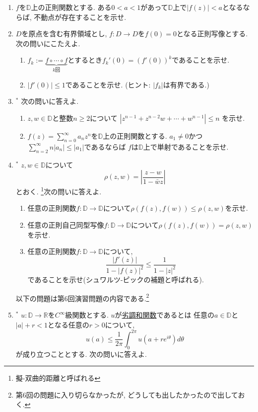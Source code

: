 \documentclass[dvipdfmx,a4paper,11pt]{article}
\newcommand{\R}{\mathbb{R}}
\newcommand{\D}{\mathbb{D}}
\theoremstyle{definition}
\begin{document}
\begin{enumerate}[label=\textbf{問}7.\arabic*]
      \item $f$を$\D$上の正則関数とする. ある$0 < a<1$があって$\D$上で$|f(z)| <a$となるならば, 不動点が存在することを示せ.

\newpage

  
\item $D$を原点を含む有界領域とし, $f : D \rightarrow D$を$f(0)=0$となる正則写像とする.次の問いにこたえよ.
     \begin{enumerate}
\setlength{\parskip}{0cm} 
  \setlength{\itemsep}{0cm} 
  \item $f_k:=\underbrace{f \circ \cdots \circ f}_{\text{$k$回}}$とするとき$f_{k}' (0) = (f'(0))^k$であることを示せ. 
  \item $|f'(0)| \le 1$であることを示せ.  (ヒント: $|f_k|$は有界である.)
    \end{enumerate} 
  \item $^{*}$ 次の問いに答えよ.
   \begin{enumerate}
\setlength{\parskip}{0cm} 
  \setlength{\itemsep}{0cm} 
  \item $z,w \in \D $と整数$ n \ge 2$について
  $
  |z^{n-1}+ z^{n-2}w + \cdots +w^{n-1}| \le n
  $
を示せ.
  \item $f(z) = \sum_{n=0}^{\infty}a_n z^n$を$\D$上の正則関数とする. 
  $a_1 \neq 0$かつ$\sum_{n=2}^{\infty}n|a_n| \le |a_1|$であるならば
  $f $は$\D$上で単射であることを示せ.
    \end{enumerate} 
  


   \item $^{*}$ $z, w \in \D$について
   $$
   \rho (z,w)= \left|\frac{z-w}{1 - \bar{w}z}\right|
   $$
   とおく. \footnote{擬-双曲的距離と呼ばれる}次の問いに答えよ. 
   \begin{enumerate}
\setlength{\parskip}{0cm} 
  \setlength{\itemsep}{0cm} 
  \item 任意の正則関数$f : \D \to \D$について$\rho(f(z), f(w)) \le \rho(z, w)$を示せ.
  \item 任意の正則自己同型写像$f : \D \to \D$について$\rho(f(z), f(w)) = \rho(z, w)$を示せ. 
   \item 任意の正則関数$f : \D \to \D$について,
   $$
   \frac{|f'(z)|}{1 - |f(z)|^2} \le    \frac{1}{1 - |z|^2} 
   $$
   であることを示せ(シュワルツ-ピックの補題と呼ばれる).
           \end{enumerate} 

\hspace{-12pt}
以下の問題は第6回演習問題の内容である.\footnote{第6回の問題に入り切らなかったが, どうしても出したかったので出しておく.}
 \item $^{*}$  $u : \D \rightarrow \R$を$C^{\infty}$級関数とする. $u$が\underline{劣調和関数}であるとは
 任意の$a \in \D$と$|a|+r <1$となる任意の$r>0$について, 
 $$
 u(a) \le \frac{1}{2 \pi} \int_{0}^{2 \pi}  u(a +  re^{i \theta})  d \theta
 $$
 が成り立つこととする. 次の問いに答えよ. 


\end{enumerate}
\end{document}
